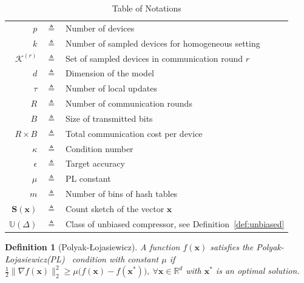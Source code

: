 \documentclass{article}
\newcommand{\pl}{Polyak-\L{}ojasiewicz}
\newtheorem{definition}{Definition}
\begin{document}
\begin{table}[htbp]\caption{Table of Notations}
\begin{center}%
\begin{tabular}{r c p{10cm} }
\toprule
$p$ & $\triangleq$ & Number of devices\\
$k$ & $\triangleq$ & Number of sampled devices for homogeneous setting\\
$\mathcal{K}^{(r)}$ & $\triangleq$ & Set of sampled devices in communication round $r$\\
$d$ & $\triangleq$ &  Dimension of the model \\
$\tau$ & $\triangleq$ & Number of local updates\\
$R$ & $\triangleq$ & Number of communication rounds\\
$B$ & $\triangleq$ &  Size of transmitted bits \\
$R\times B$ & $\triangleq$ &  Total communication cost per device \\
$\kappa$ & $\triangleq$ & Condition number\\
$\epsilon$ & $\triangleq$ & Target accuracy\\
$\mu$ & $\triangleq$ & PL constant \\
$m$ & $\triangleq$ &  Number of bins of hash tables \\
 $\mathbf{S}(\boldsymbol{x})$  & $\triangleq$ &  Count sketch of the vector $\boldsymbol{x}$\\
 $\mathbb{U}(\Delta)$  & $\triangleq$ &  Class of unbiased compressor, see Definition~\ref{def:unbiased}\\
\bottomrule
\end{tabular}
\end{center}
\label{tab:notations}
\end{table}

\begin{definition}[\pl]\label{assum:pl}
A function $f(\boldsymbol{x})$ satisfies the \pl (PL)~ condition with constant $\mu$ if $\frac{1}{2}\|\nabla f(\boldsymbol{x})\|_2^2\geq \mu\big(f(\boldsymbol{x})-f(\boldsymbol{x}^*)\big),\: \forall \boldsymbol{x}\in\mathbb{R}^d $ with $\boldsymbol{x}^*$ is an optimal solution.
\end{definition}


\end{document}
